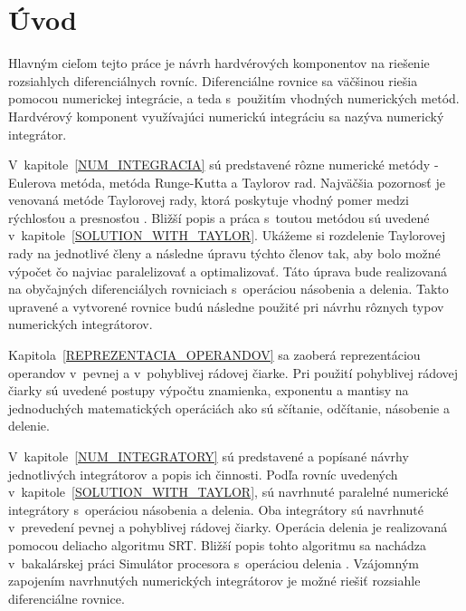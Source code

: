 
\chapter{Úvod}
Hlavným cieľom tejto práce je návrh hardvérových komponentov na riešenie rozsiahlych diferenciálnych rovníc. Diferenciálne rovnice sa väčšinou riešia pomocou numerickej integrácie, a teda s~použitím vhodných numerických metód. Hardvérový komponent využívajúci numerickú integráciu sa nazýva numerický integrátor.

V~kapitole~\ref{NUM_INTEGRACIA} sú predstavené rôzne numerické metódy - Eulerova metóda, metóda Runge-Kutta a Taylorov rad. Najväčšia pozornosť je venovaná metóde Taylorovej rady, ktorá poskytuje vhodný pomer medzi rýchlosťou a presnosťou \cite{KunovskyH}. Bližší popis a práca s~toutou metódou sú uvedené v~kapitole~\ref{SOLUTION_WITH_TAYLOR}. Ukážeme si rozdelenie Taylorovej rady na jednotlivé členy a následne úpravu týchto členov tak, aby bolo možné výpočet čo najviac paralelizovať a optimalizovať. Táto úprava bude realizovaná na obyčajných diferenciálych rovniciach s~operáciou násobenia a delenia. Takto upravené a vytvorené rovnice budú následne použité pri návrhu rôznych typov numerických integrátorov.

Kapitola~\ref{REPREZENTACIA_OPERANDOV} sa zaoberá reprezentáciou operandov v~pevnej a v~pohyblivej rádovej čiarke. Pri použití pohyblivej rádovej čiarky sú uvedené postupy výpočtu znamienka, exponentu a mantisy na jednoduchých matematických operáciách ako sú sčítanie, odčítanie, násobenie a delenie.

V~kapitole~\ref{NUM_INTEGRATORY} sú predstavené a popísané návrhy jednotlivých integrátorov a popis ich činnosti. Podľa rovníc uvedených v~kapitole~\ref{SOLUTION_WITH_TAYLOR}, sú navrhnuté paralelné numerické integrátory s~operáciou násobenia a delenia. Oba integrátory sú navrhnuté v~prevedení pevnej a pohyblivej rádovej čiarky. Operácia delenia je realizovaná pomocou deliacho algoritmu SRT. Bližší popis tohto algoritmu sa nachádza v~bakalárskej práci Simulátor procesora s~operáciou delenia \cite{MatecnyBP}.
Vzájomným zapojením navrhnutých numerických integrátorov je možné riešiť rozsiahle diferenciálne rovnice.




